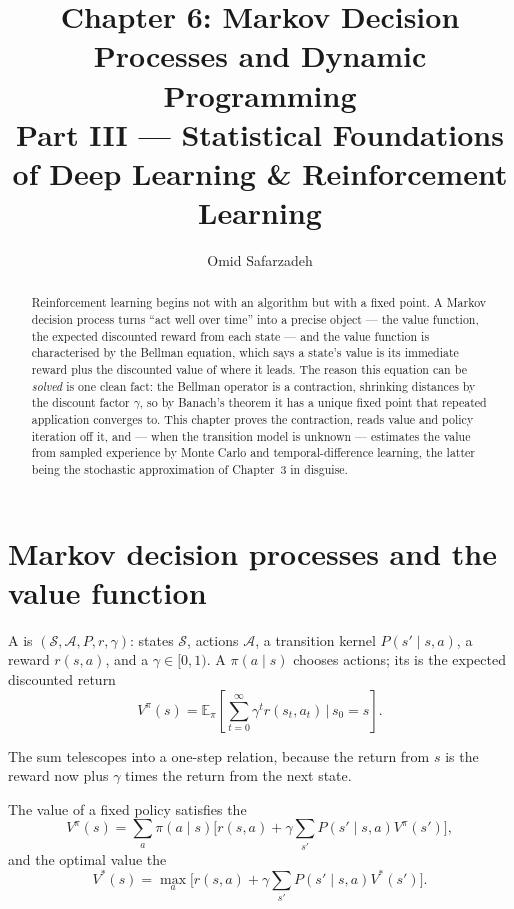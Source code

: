 \documentclass[11pt]{article}
\title{Chapter 6: Markov Decision Processes and Dynamic Programming \\ \large Part III --- Statistical Foundations of Deep Learning \& Reinforcement Learning}
\author{Omid Safarzadeh}
\date{}
\begin{document}
\maketitle

\begin{abstract}
\noindent
Reinforcement learning begins not with an algorithm but with a fixed point. A
Markov decision process turns ``act well over time'' into a precise object --- the
value function, the expected discounted reward from each state --- and the value
function is characterised by the Bellman equation, which says a state's value is
its immediate reward plus the discounted value of where it leads. The reason this
equation can be \emph{solved} is one clean fact: the Bellman operator is a
contraction, shrinking distances by the discount factor $\gamma$, so by Banach's
theorem it has a unique fixed point that repeated application converges to. This
chapter proves the contraction, reads value and policy iteration off it, and ---
when the transition model is unknown --- estimates the value from sampled
experience by Monte Carlo and temporal-difference learning, the latter being the
stochastic approximation of Chapter~3 in disguise.
\end{abstract}

\tableofcontents

\section{Markov decision processes and the value function}

\begin{definition}[MDP]
A  is $(\mathcal{S},\mathcal{A},P,r,\gamma)$:
states $\mathcal{S}$, actions $\mathcal{A}$, a transition kernel
$P(s'\mid s,a)$, a reward $r(s,a)$, and a  $\gamma\in[0,1)$. A
 $\pi(a\mid s)$ chooses actions; its  is
the expected discounted return
\[
  V^\pi(s) = \mathbb{E}_\pi\!\left[\sum_{t=0}^\infty \gamma^t r(s_t,a_t)\,\Big|\, s_0=s\right].
\]
\end{definition}

The sum telescopes into a one-step relation, because the return from $s$ is the
reward now plus $\gamma$ times the return from the next state.

\begin{definition}
The value of a fixed policy satisfies the 
\[
  V^\pi(s) = \sum_a \pi(a\mid s)\Big[r(s,a) + \gamma\sum_{s'}P(s'\mid s,a)V^\pi(s')\Big],
\]
and the optimal value the 
\[
  V^*(s) = \max_a\Big[r(s,a) + \gamma\sum_{s'}P(s'\mid s,a)V^*(s')\Big].
\]
\end{definition}
\end{document}
